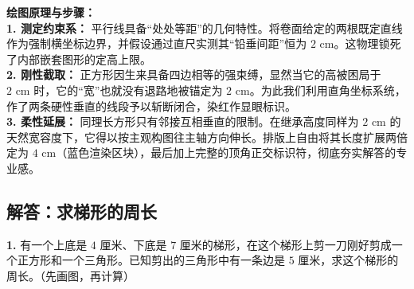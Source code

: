 \vspace{0.4cm}
{\small\color{blue!70!black}
\textbf{绘图原理与步骤：}\\
\textbf{1. 测定约束系：} 平行线具备“处处等距”的几何特性。将卷面给定的两根既定直线作为强制横坐标边界，并假设通过直尺实测其“铅垂间距”恒为 $2\text{ cm}$。这物理锁死了内部嵌套图形的定高上限。\\
\textbf{2. 刚性截取：} 正方形因生来具备四边相等的强束缚，显然当它的高被困局于 $2\text{ cm}$ 时，它的“宽”也就没有退路地被锚定为 $2\text{ cm}$。为此我们利用直角坐标系统，作了两条硬性垂直的线段予以斩断闭合，染红作显眼标识。\\
\textbf{3. 柔性延展：} 同理长方形只有邻接互相垂直的限制。在继承高度同样为 $2\text{ cm}$ 的天然宽容度下，它得以按主观构图往主轴方向伸长。排版上自由将其长度扩展两倍定为 $4\text{ cm}$（蓝色渲染区块），最后加上完整的顶角正交标识符，彻底夯实解答的专业感。
}

\newpage

\newpage

\subsection{解答：求梯形的周长}

\vspace{0.4cm}

\noindent\textbf{1.} 有一个上底是 $4$ 厘米、下底是 $7$ 厘米的梯形，在这个梯形上剪一刀刚好剪成一个正方形和一个三角形。已知剪出的三角形中有一条边是 $5$ 厘米，求这个梯形的周长。（先画图，再计算）

\vspace{0.8cm}

\begin{center}
\end{center}

